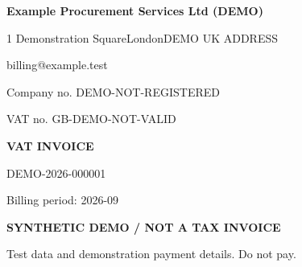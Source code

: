 \documentclass[10pt,a4paper]{article}
\begin{document}
\color{ink}
\raggedright
\begin{minipage}[t]{0.57\textwidth}
\vspace{0pt}
\raggedright
{\Large\bfseries Example Procurement Services Ltd (DEMO)}\par
{\small 1 Demonstration Square\newline{}London\newline{}DEMO UK ADDRESS\par
billing@example.test\par
Company no. DEMO-NOT-REGISTERED

\par VAT no. GB-DEMO-NOT-VALID

}
\end{minipage}\hfill
\begin{minipage}[t]{0.39\textwidth}\raggedleft
\vspace{0pt}
{\Huge\bfseries VAT INVOICE}\par
{\large DEMO-2026-000001}\par
{\small\color{muted}Billing period: 2026-09}
\end{minipage}
\par\vspace{5mm}

\colorbox{pale}{\parbox{\dimexpr\textwidth-2\fboxsep\relax}{\centering\small\bfseries\color{demo}SYNTHETIC DEMO / NOT A TAX INVOICE\par\normalfont\footnotesize Test data and demonstration payment details. Do not pay.}}
\vspace{4mm}
\end{document}
